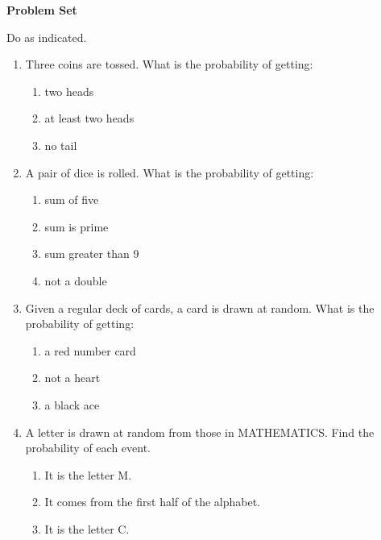 \textbf{Problem Set}

\vspce

Do as indicated. 
\begin{enumerate}[label = \arabic*. ]
\item Three coins are tossed. What is the probability of getting:
\begin{enumerate}[label = \alph*. ]
\item two heads
\item at least two heads
\item no tail

\end{enumerate} 
\item A pair of dice is rolled. What is the probability of getting: 
\begin{enumerate}[label = \alph*. ]
\item sum of five
\item sum is prime
\item sum greater  than 9
\item not a double 
\end{enumerate} 
\item Given a regular deck of cards, a card is drawn at random. What is the probability of getting:
\begin{enumerate}[label = \alph*. ]
\item a red number card
\item not a heart 
\item a black ace
\end{enumerate} 
\item A letter is drawn at random from those in MATHEMATICS. Find the probability of each event.
\begin{enumerate}[label = \alph*. ]
\item It is the letter M. 
\item It comes from the first half of the alphabet. 
\item It is the letter C.
\end{enumerate} 
 
\end{enumerate}   

 
